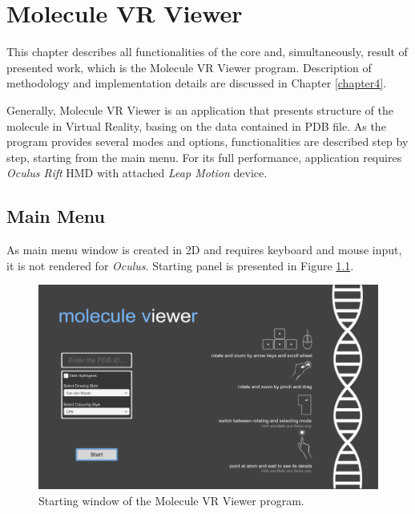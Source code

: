 
\chapter{Molecule VR Viewer}\label{chapter3}  %

This chapter describes all functionalities of the core and, simultaneously, result of presented work, which is the Molecule VR Viewer program. Description of methodology and implementation details are discussed in Chapter \ref{chapter4}.

Generally, Molecule VR Viewer is an application that presents structure of the molecule in Virtual Reality, basing on the data contained in PDB file. As the program provides several modes and options, functionalities are described step by step, starting from the main menu. For its full performance, application requires \textit{Oculus Rift} HMD with attached \textit{Leap Motion} device. 

\section{Main Menu} %

As main menu window is created in 2D and requires keyboard and mouse input, it is not rendered for \textit{Oculus}. Starting panel is presented in Figure \ref{fig:mainmenu}.

\begin{figure}[h]
\centering    
\includegraphics[width=1.0\textwidth]{Figs/mainmenu.png}
\caption{Starting window of the Molecule VR Viewer program.}
\label{fig:mainmenu} 
\end{figure} 

